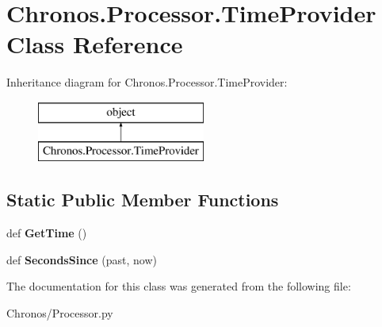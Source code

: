 \hypertarget{classChronos_1_1Processor_1_1TimeProvider}{}\section{Chronos.\+Processor.\+Time\+Provider Class Reference}
\label{classChronos_1_1Processor_1_1TimeProvider}
Inheritance diagram for Chronos.\+Processor.\+Time\+Provider\+:\begin{figure}[H]
\begin{center}
\leavevmode
\includegraphics[height=2.000000cm]{classChronos_1_1Processor_1_1TimeProvider}
\end{center}
\end{figure}
\subsection*{Static Public Member Functions}
\begin{DoxyCompactItemize}
\item 
def {\bfseries Get\+Time} ()\hypertarget{classChronos_1_1Processor_1_1TimeProvider_ab023a30292cbb0143a6b3378f378564b}{}\label{classChronos_1_1Processor_1_1TimeProvider_ab023a30292cbb0143a6b3378f378564b}

\item 
def {\bfseries Seconds\+Since} (past, now)\hypertarget{classChronos_1_1Processor_1_1TimeProvider_a7ae29b2067f9e24d6f4b0a5579f44f71}{}\label{classChronos_1_1Processor_1_1TimeProvider_a7ae29b2067f9e24d6f4b0a5579f44f71}

\end{DoxyCompactItemize}


The documentation for this class was generated from the following file\+:\begin{DoxyCompactItemize}
\item 
Chronos/Processor.\+py\end{DoxyCompactItemize}
